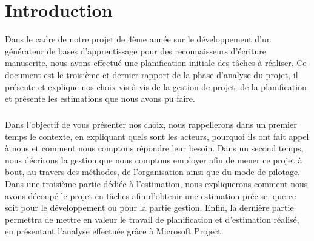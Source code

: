 \chapter{Introduction}
\setcounter{page}{1}
\pagestyle{fancy}
\fancyhf{}
\cfoot[\thepage]{\thepage}

Dans le cadre de notre projet de 4ème année sur le développement d’un générateur de bases d’apprentissage pour des reconnaisseurs d’écriture manuscrite, nous avons effectué une planification initiale des tâches à réaliser. Ce document est le troisième et dernier rapport de la phase d’analyse du projet, il présente et explique nos choix vis-à-vis de la gestion de projet, de la planification et présente les estimations que nous avons pu faire.

\paragraph{}
Dans l’objectif de vous présenter nos choix, nous rappellerons dans un premier temps le contexte, en expliquant quels sont les acteurs, pourquoi ils ont fait appel à nous et comment nous comptons répondre leur besoin. Dans un second temps, nous décrirons la gestion que nous comptons employer afin de mener ce projet à bout, au travers des méthodes, de l’organisation ainsi que du mode de pilotage. Dans une troisième partie dédiée à l’estimation, nous expliquerons comment nous avons découpé le projet en tâches afin d’obtenir une estimation précise, que ce soit pour le développement ou pour la partie gestion. Enfin, la dernière partie permettra de mettre en valeur le travail de planification et d’estimation réalisé, en présentant l’analyse effectuée grâce à Microsoft Project.
